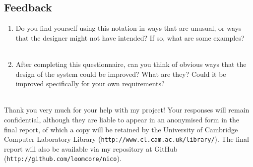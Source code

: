 \documentclass[14pt]{article}
\newcommand{\answerbox}{
\fbox{
\begin{minipage}{16cm}
\hfill\vspace{2cm}
\end{minipage}
}\\
}
\begin{document}
\subsection{Feedback}

\begin{enumerate}
\item Do you find yourself using this notation in ways that are unusual, or ways that the designer might not have intended? If so, what are some examples?\\
\answerbox

\pagebreak

\item After completing this questionnaire, can you think of obvious ways that the design of the system could be improved? What are they? Could it be improved specifically for your own requirements?\\
\answerbox
\end{enumerate}

Thank you very much for your help with my project!  Your responses will remain
confidential, although they are liable to appear in an anonymised form
in the final report, of which a copy will be retained by the University of
Cambridge Computer Laboratory Library
(\verb¬http://www.cl.cam.ac.uk/library/¬).  The final report will also be
available via my repository at GitHub
(\verb¬http://github.com/loomcore/nico¬).
\end{document}
